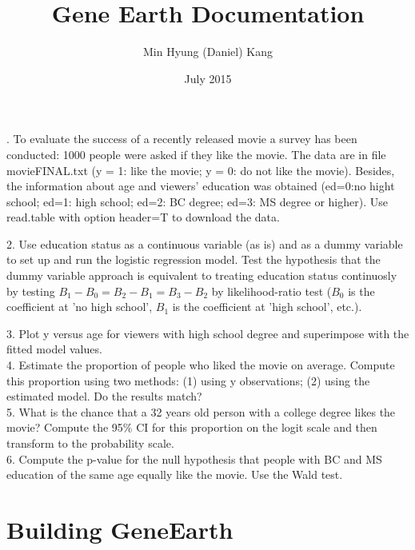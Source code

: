 \documentclass[]{article}
\begin{document}


\title{Gene Earth Documentation}
\author{Min Hyung (Daniel) Kang}
\date{July 2015}
\maketitle


\bigskip \bigskip \bigskip \bigskip\bigskip \bigskip \bigskip {}. To evaluate the success of a recently released movie a survey has been conducted: 1000 people were asked if they like the movie. The data are in file movieFINAL.txt (y = 1: like the movie; y = 0: do not like the movie). Besides, the information about age and viewers’ education was obtained (ed=0:no hight school; ed=1: high school; ed=2: BC degree; ed=3: MS degree or higher). Use read.table
with option header=T to download the data.

\bigskip

2. Use education status as a continuous variable (as is) and as a dummy variable to set up and run
the logistic regression model. Test the hypothesis that the dummy variable approach is equivalent to
treating education status continuosly by testing $B_1-B_0=B_2-B_1=B_3-B_2$ by likelihood-ratio
test ($B_0$ is the coefficient at ’no high school’, $B_1$ is the coefficient at ’high school’, etc.).\\
\bigskip

3. Plot y versus age for viewers with high school degree and superimpose with the fitted model values.\\

4. Estimate the proportion of people who liked the movie on average. Compute this proportion using
two methods: (1) using y observations; (2) using the estimated model. Do the results match?\\

5. What is the chance that a 32 years old person with a college degree likes the movie? Compute the
95\% CI for this proportion on the logit scale and then transform to the probability scale.\\

6. Compute the p-value for the null hypothesis that people with BC and MS education of the same age
equally like the movie. Use the Wald test.

\restoregeometry
\pagebreak
\section{Building GeneEarth}
\end{document}
